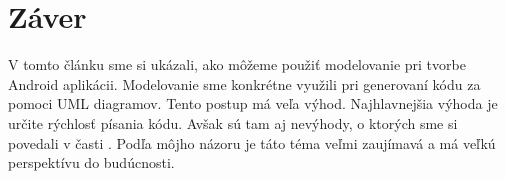 \documentclass[10pt,twoside,slovak,a4paper]{article}
\begin{document}
 
 

\section{Záver} \label{zaver} %
V tomto článku sme si ukázali, ako môžeme použiť modelovanie pri tvorbe Android aplikácii. Modelovanie sme konkrétne využili pri generovaní kódu za pomoci UML diagramov. Tento postup má veľa výhod. Najhlavnejšia výhoda je určite rýchlosť písania kódu. Avšak sú tam aj nevýhody, o ktorých sme si povedali v časti .\newline
Podľa môjho názoru je táto téma veľmi zaujímavá a má veľkú perspektívu do budúcnosti. 






\end{document}
